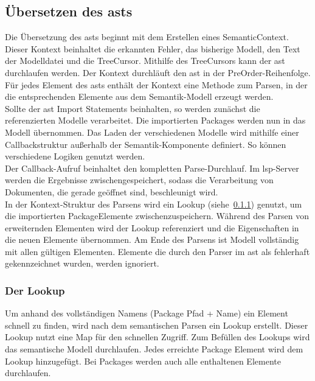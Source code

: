 \documentclass[./einleitung.tex]{subfiles}
\begin{document}
    \subsection{Übersetzen des \acrshort{ast}s}\label{subsec:ubersetzen-des-asts}
    Die Übersetzung des \acrshort{ast}s beginnt mit dem Erstellen eines SemanticContext.
    Dieser Kontext beinhaltet die erkannten Fehler, das bisherige Modell, den Text der Modelldatei und die TreeCursor.
    Mithilfe des TreeCursors kann der \acrshort{ast} durchlaufen werden.
    Der Kontext durchläuft den \acrshort{ast} in der PreOrder-Reihenfolge.
    Für jedes Element des \acrshort{ast}s enthält der Kontext eine Methode zum Parsen, in der die entsprechenden Elemente aus dem Semantik-Modell erzeugt werden.\\
    Sollte der \acrshort{ast} Import Statements beinhalten, so werden zunächst die referenzierten Modelle verarbeitet.
    Die importierten Packages werden nun in das Modell übernommen.
    Das Laden der verschiedenen Modelle wird mithilfe einer Callbackstruktur außerhalb der Semantik-Komponente definiert.
    So können verschiedene Logiken genutzt werden. \\
    Der Callback-Aufruf beinhaltet den kompletten Parse-Durchlauf.
    Im \acrshort{lsp}-Server werden die Ergebnisse zwischengespeichert, sodass die Verarbeitung von Dokumenten, die gerade geöffnet sind, beschleunigt wird.\\
    In der Kontext-Struktur des Parsens wird ein Lookup (siehe~\ref{subsubsec:lookup}) genutzt, um die importierten PackageElemente zwischenzuspeichern.
    Während des Parsen von erweiternden Elementen wird der Lookup referenziert und die Eigenschaften in die neuen Elemente übernommen.
    Am Ende des Parsens ist Modell vollständig mit allen gültigen Elementen.
    Elemente die durch den Parser im \acrshort{ast} als fehlerhaft gekennzeichnet wurden, werden ignoriert.

    \subsubsection{Der Lookup}\label{subsubsec:lookup}
    Um anhand des vollständigen Namens (Package Pfad + Name) ein Element schnell zu finden, wird nach dem semantischen Parsen ein Lookup erstellt.
    Dieser Lookup nutzt eine Map für den schnellen Zugriff.
    Zum Befüllen des Lookups wird das semantische Modell durchlaufen.
    Jedes erreichte Package Element wird dem Lookup hinzugefügt.
    Bei Packages werden auch alle enthaltenen Elemente durchlaufen.
\end{document}
